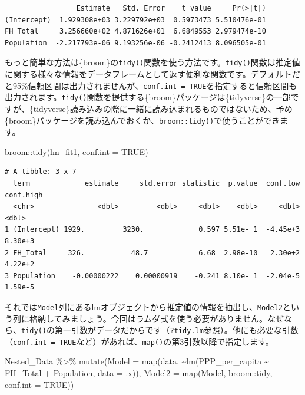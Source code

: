 \documentclass[
  a4paper,
  pandoc,
  ja=standard,
  jafont=haranoaji]{bxjsbook}
\newenvironment{Shaded}{\begin{snugshade}}{\end{snugshade}}
\newcommand{\AttributeTok}[1]{\textcolor[rgb]{0.00,0.48,0.65}{#1}}
\newcommand{\ConstantTok}[1]{\textcolor[rgb]{0.56,0.35,0.01}{#1}}
\newcommand{\FunctionTok}[1]{\textcolor[rgb]{0.28,0.35,0.67}{#1}}
\newcommand{\NormalTok}[1]{\textcolor[rgb]{0.00,0.48,0.65}{#1}}
\newcommand{\SpecialCharTok}[1]{\textcolor[rgb]{0.37,0.37,0.37}{#1}}
\begin{document}
\begin{verbatim}
                 Estimate   Std. Error    t value     Pr(>|t|)
(Intercept)  1.929308e+03 3.229792e+03  0.5973473 5.510476e-01
FH_Total     3.256660e+02 4.871626e+01  6.6849553 2.979474e-10
Population  -2.217793e-06 9.193256e-06 -0.2412413 8.096505e-01
\end{verbatim}

もっと簡単な方法は\{broom\}の\texttt{tidy()}関数を使う方法です。\texttt{tidy()}関数は推定値に関する様々な情報をデータフレームとして返す便利な関数です。デフォルトだと95\%信頼区間は出力されませんが、\texttt{conf.int\ =\ TRUE}を指定すると信頼区間も出力されます。\texttt{tidy()}関数を提供する\{broom\}パッケージは\{tidyverse\}の一部ですが、\{tidyverse\}読み込みの際に一緒に読み込まれるものではないため、予め\{broom\}パッケージを読み込んでおくか、\texttt{broom::tidy()}で使うことができます。

\begin{Shaded}
\begin{Highlighting}[numbers=left,,]
\NormalTok{broom}\SpecialCharTok{::}\FunctionTok{tidy}\NormalTok{(lm\_fit1, }\AttributeTok{conf.int =} \ConstantTok{TRUE}\NormalTok{)}
\end{Highlighting}
\end{Shaded}

\begin{verbatim}
# A tibble: 3 x 7
  term             estimate     std.error statistic  p.value  conf.low conf.high
  <chr>               <dbl>         <dbl>     <dbl>    <dbl>     <dbl>     <dbl>
1 (Intercept) 1929.         3230.             0.597 5.51e- 1  -4.45e+3   8.30e+3
2 FH_Total     326.           48.7            6.68  2.98e-10   2.30e+2   4.22e+2
3 Population    -0.00000222    0.00000919    -0.241 8.10e- 1  -2.04e-5   1.59e-5
\end{verbatim}

それでは\texttt{Model}列にあるlmオブジェクトから推定値の情報を抽出し、\texttt{Model2}という列に格納してみましょう。今回はラムダ式を使う必要がありません。なぜなら、\texttt{tidy()}の第一引数がデータだからです（\texttt{?tidy.lm}参照）。他にも必要な引数（\texttt{conf.int\ =\ TRUE}など）があれば、\texttt{map()}の第3引数以降で指定します。

\begin{Shaded}
\begin{Highlighting}[numbers=left,,]
\NormalTok{Nested\_Data }\SpecialCharTok{\%\textgreater{}\%}
  \FunctionTok{mutate}\NormalTok{(}\AttributeTok{Model  =} \FunctionTok{map}\NormalTok{(data, }
                      \SpecialCharTok{\textasciitilde{}}\FunctionTok{lm}\NormalTok{(PPP\_per\_capita }\SpecialCharTok{\textasciitilde{}}\NormalTok{ FH\_Total }\SpecialCharTok{+}\NormalTok{ Population, }
                          \AttributeTok{data =}\NormalTok{ .x)),}
         \AttributeTok{Model2 =} \FunctionTok{map}\NormalTok{(Model, broom}\SpecialCharTok{::}\NormalTok{tidy, }\AttributeTok{conf.int =} \ConstantTok{TRUE}\NormalTok{))}
\end{Highlighting}
\end{Shaded}
\end{document}
